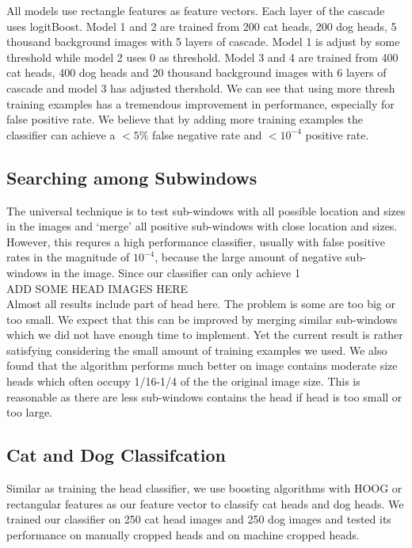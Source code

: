 \documentclass[12pt]{article}
\begin{document}
All models use rectangle features as feature vectors. Each layer of the cascade uses logitBoost. Model 1 and 2 are trained from 200 cat heads, 200 dog heads, 5 thousand background images with 5 layers of cascade. Model 1 is adjust by some threshold while model 2 uses 0 as threshold. Model 3 and 4 are trained from 400 cat heads, 400 dog heads and 20 thousand background images with 6 layers of cascade and model 3 has adjusted thershold. We can see that using more thresh training examples has a tremendous improvement in performance, especially for false positive rate. We believe that by adding more training examples the classifier can achieve a $<5\%$ false negative rate and $<10^{-4}$ positive rate.

\subsection{Searching among Subwindows}

The universal technique is to test sub-windows with all possible location and sizes in the images and `merge' all positive sub-windows with close location and sizes. However, this requres a high performance classifier, usually with false positive rates in the magnitude of $10^{-4}$, because the large amount of negative sub-windows in the image. Since our classifier can only achieve 1\\
ADD SOME HEAD IMAGES HERE\\
Almost all results include part of head here. The problem is some are too big or too small. We expect that this can be improved by merging similar sub-windows which we did not have enough time to implement. Yet the current result is rather satisfying considering the small amount of training examples we used. We also found that the algorithm performs much better on image contains moderate size heads which often occupy 1/16-1/4 of the the original image size. This is reasonable as there are less sub-windows contains the head if head is too small or too large.
\subsection{Cat and Dog Classifcation}
Similar as training the head classifier, we use boosting algorithms with HOOG or rectangular features as our feature vector to classify cat heads and dog heads. We trained our classifier on 250 cat head images and 250 dog images and tested its performance on manually cropped heads and on machine cropped heads.
\end{document}
